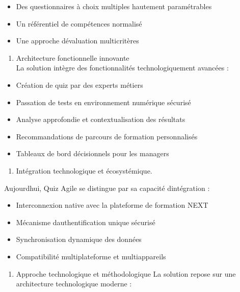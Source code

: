 \documentclass[12pt,a4paper,twoside,openright]{report}
\begin{document}
\begin{itemize}
\item
  Des questionnaires à choix multiples hautement paramétrables
\item
  Un référentiel de compétences normalisé
\item
  Une approche d\textquotesingle évaluation multicritères
\end{itemize}

\begin{enumerate}
\def\labelenumi{\arabic{enumi}.}
\setcounter{enumi}{1}
\item
  Architecture fonctionnelle innovante~\\
  La solution intègre des fonctionnalités technologiquement avancées :
\end{enumerate}

\begin{itemize}
\item
  Création de quiz par des experts métiers
\item
  Passation de tests en environnement numérique sécurisé
\item
  Analyse approfondie et contextualisation des résultats
\item
  Recommandations de parcours de formation personnalisés
\item
  Tableaux de bord décisionnels pour les managers
\end{itemize}

\begin{enumerate}
\def\labelenumi{\arabic{enumi}.}
\setcounter{enumi}{2}
\item
  Intégration technologique et écosystémique.
\end{enumerate}

Aujourd\textquotesingle hui, Quiz Agile se distingue par sa capacité
d\textquotesingle intégration :

\begin{itemize}
\item
  Interconnexion native avec la plateforme de formation NEXT
\item
  Mécanisme d\textquotesingle authentification unique sécurisé
\item
  Synchronisation dynamique des données
\item
  Compatibilité multiplateforme et multiappareils
\end{itemize}

\begin{enumerate}
\def\labelenumi{\arabic{enumi}.}
\setcounter{enumi}{3}
\item
  Approche technologique et méthodologique La solution repose sur une
  architecture technologique moderne :
\end{enumerate}
\end{document}
